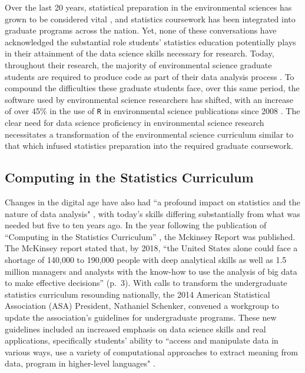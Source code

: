 \documentclass[12pt]{article}
\begin{document}

\quad Over the last 20 years, statistical preparation in the environmental 
sciences has grown to be considered vital \citep{hampton}, and statistics
coursework has been integrated into graduate programs across the nation. Yet,
none of these conversations have acknowledged the substantial role students'
statistics education potentially plays in their attainment of the data science
skills necessary for research. Today, throughout their research, the majority of 
environmental science graduate students are required to produce code as part of
their data analysis process \citep{mislan}. To compound the difficulties these 
graduate students face, over this same period, the software used by
environmental science researchers has shifted, with an increase of over 45\%
in the use of \texttt{R} in environmental science publications since 2008
\citep{Rpopular}. The clear need for data science proficiency in environmental
science research necessitates a transformation of the environmental science
curriculum similar to that which infused statistics preparation into the
required graduate coursework. 

\subsection{Computing in the Statistics Curriculum}

\quad Changes in the digital age have also had ``a profound impact on statistics
and the nature of data analysis" \citep[p.\ 97]{nolan}, with today's skills 
differing substantially from what was needed but five to ten years ago. 
In the year following the publication of ``Computing in the Statistics 
Curriculum'' \citep{nolan}, the Mckinsey Report \citep{mckinsey} was published. 
The McKinsey report stated that, by 2018, ``the United States alone could face a
shortage of 140,000 to 190,000 people with deep analytical skills as well as 1.5
million managers and analysts with the know-how to use the analysis of big data
to make effective decisions'' (p.\ 3). With calls to transform the undergraduate
statistics curriculum resounding nationally, the 2014 American Statistical 
Association (ASA) President, Nathaniel Schenker, convened a workgroup to update
the association's guidelines for undergraduate programs. These new guidelines 
included an increased emphasis on data science skills and real applications, 
specifically students' ability to ``access and manipulate data in various ways,
use a variety of computational approaches to extract meaning from data, program
in higher-level languages" \citep[p.\ 7]{asa}. 
\end{document}
